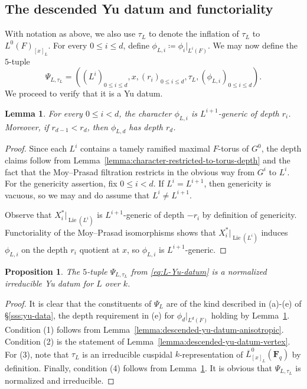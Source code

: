 \documentclass[reqno]{amsart}
\numberwithin{equation}{subsection}
\newcommand{\F}{\mathbf{F}}
\newcommand{\ol}[1]{\overline{#1}}
\DeclareMathOperator{\Lie}{Lie}
\newtheorem{lemma}[thm]{Lemma}
\newtheorem{prop}[thm]{Proposition}
\theoremstyle{remark}
\numberwithin{equation}{subsection}
\numberwithin{figure}{subsection}
\begin{document}
\subsection{The descended Yu datum and functoriality}\label{ss:unram-levi-yu-datum}
With notation as above, we also use $\tau_L$ to denote the inflation of $\tau_L$ to $L^0(F)_{[x]_L}$.
For every $0\leq i\leq d$, define $\phi_{L,i}\coloneqq \phi_i|_{L^i(F)}$. We may now define the $5$-tuple
\begin{equation}\label{eq:L-Yu-datum}
\Psi_{L,\tau_L} = ((L^i)_{0 \leq i \leq d}, x, (r_i)_{0 \leq i \leq d}, \tau_L, (\phi_{L,i})_{0\leq i \leq d}).
\end{equation}
We proceed to verify that it is a Yu datum.

\begin{lemma}\label{lemma:generic-character-restriction}For every $0\leq i<d$, the character $\phi_{L,i}$ is $L^{i+1}$-generic of depth $r_i$. Moreover, if $r_{d-1}<r_d$, then $\phi_{L,d}$ has depth $r_d$.
\end{lemma}

\begin{proof}
Since each $L^i$ contains a tamely ramified maximal $F$-torus of $G^0$, the depth claims follow from Lemma~\ref{lemma:character-restricted-to-torus-depth} and the fact that the Moy--Prasad filtration restricts in the obvious way from $G^i$ to $L^i$. For the genericity assertion, fix $0 \leq i<d$. If $L^i = L^{i+1}$, then genericity is vacuous, so we may and do assume that $L^i \neq L^{i+1}$.

Observe that $X_i^*|_{\Lie(L^i)}$ is $L^{i+1}$-generic of depth $-r_i$ by definition of genericity. Functoriality of the Moy--Prasad isomorphisms shows that $X_i^*|_{\Lie(L^i)}$ induces $\phi_{L,i}$ on the depth $r_i$ quotient at $x$, so $\phi_{L,i}$ is $L^{i+1}$-generic.
\end{proof}




\begin{prop}\label{prop:descent-to-levi-yu-datum}
The $5$-tuple $\Psi_{L,\tau_L}$ from \eqref{eq:L-Yu-datum} is a normalized irreducible Yu datum for $L$ over $k$. 
\end{prop}

\begin{proof}
It is clear that the constituents of $\Psi_L$ are of the kind described in (a)-(e) of \S\ref{sss:yu-data}, the depth requirement in (e) for $\phi_d|_{L^d(F)}$ holding by Lemma~\ref{lemma:generic-character-restriction}. Condition (1) follows from Lemma~\ref{lemma:descended-yu-datum-anisotropic}. Condition (2) is the statement of Lemma~\ref{lemma:descended-yu-datum-vertex}. For (3), note that $\tau_L$ is an irreducible cuspidal $k$-representation of $\ol L^0_{[x]_L}(\F_q)$ by definition. Finally, condition (4) follows from Lemma~\ref{lemma:generic-character-restriction}. It is obvious that $\Psi_{L,\tau_L}$ is normalized and irreducible.
\end{proof}
\end{document}
